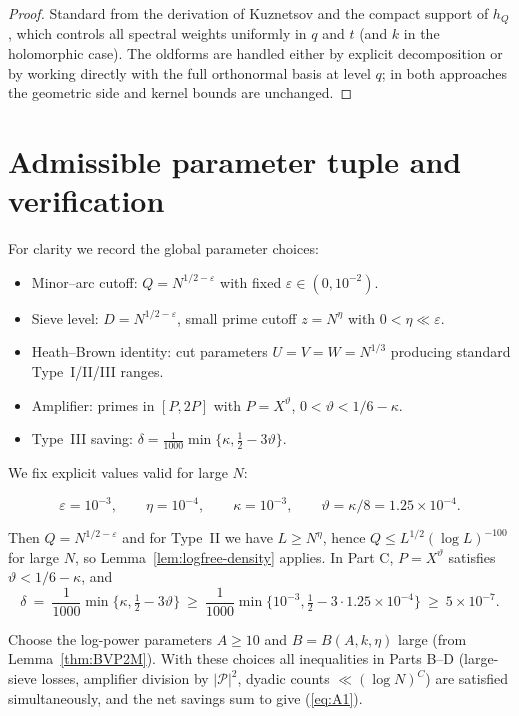 \documentclass[11pt]{article}
\def\eqref#1{(\ref{#1})}%
\theoremstyle{definition}
\theoremstyle{remark}
\numberwithin{equation}{part}
\begin{document}
\begin{proof}
	Standard from the derivation of Kuznetsov and the compact support of $h_Q$, which controls all spectral weights uniformly in $q$ and $t$ (and $k$ in the holomorphic case). The oldforms are handled either by explicit decomposition or by working directly with the full orthonormal basis at level $q$; in both approaches the geometric side and kernel bounds are unchanged.
\end{proof}

\section{Admissible parameter tuple and verification}

For clarity we record the global parameter choices:
\begin{itemize}
	\item Minor--arc cutoff: $Q=N^{1/2-\varepsilon}$ with fixed $\varepsilon\in(0,10^{-2})$.
	\item Sieve level: $D=N^{1/2-\varepsilon}$, small prime cutoff $z=N^\eta$ with $0<\eta\ll\varepsilon$.
	\item Heath--Brown identity: cut parameters $U=V=W=N^{1/3}$ producing standard Type~I/II/III ranges.
	\item Amplifier: primes in $[P,2P]$ with $P=X^\vartheta$, $0<\vartheta<1/6-\kappa$.
	\item Type~III saving: $\delta=\tfrac{1}{1000}\min\{\kappa,\tfrac12-3\vartheta\}$.
\end{itemize}


We fix explicit values valid for large $N$:

\[
	\varepsilon=10^{-3},\qquad \eta=10^{-4},\qquad \kappa=10^{-3},\qquad \vartheta=\kappa/8=1.25\times 10^{-4}.
\]

Then $Q=N^{1/2-\varepsilon}$ and for Type~II we have $L\ge N^{\eta}$, hence $Q\le L^{1/2}(\log L)^{-100}$ for large $N$, so Lemma~\ref{lem:logfree-density} applies. In Part C, $P=X^{\vartheta}$ satisfies $\vartheta<1/6-\kappa$, and
\[
	\delta\ =\ \frac1{1000}\min\{\kappa,\tfrac12-3\vartheta\}\ \ge\ \frac{1}{1000}\min\{10^{-3},\tfrac12-3\cdot 1.25\times 10^{-4}\}\ \ge\ 5\times 10^{-7}.
\]

Choose the log-power parameters $A\ge 10$ and $B=B(A,k,\eta)$ large (from Lemma~\ref{thm:BVP2M}). With these choices all inequalities in Parts B--D (large-sieve losses, amplifier division by $|\mathcal P|^2$, dyadic counts $\ll (\log N)^C$) are satisfied simultaneously, and the net savings sum to give \eqref{eq:A1}.
\end{document}

